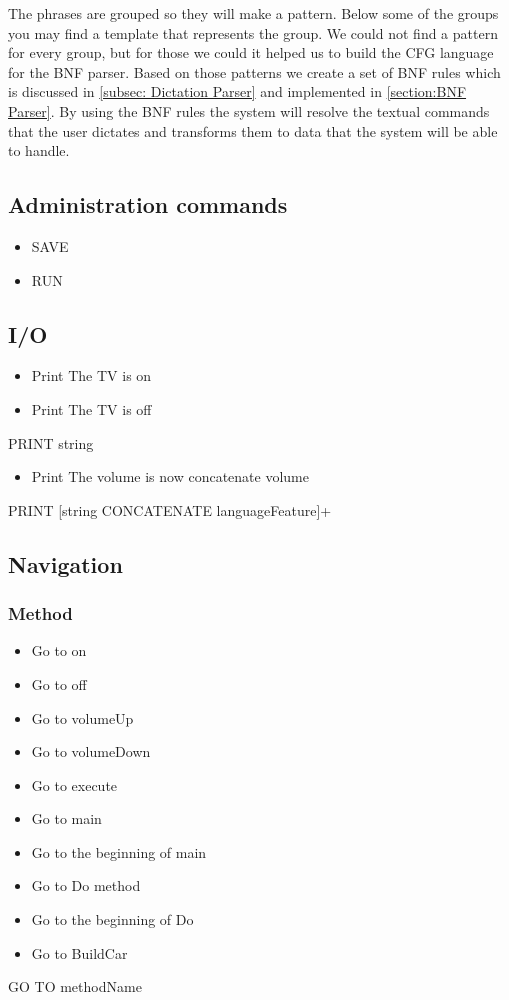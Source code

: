 The phrases are grouped so they will make a pattern. Below some of the groups you may find a template that represents the group. We could not find a pattern for every group, but for those we could it helped us to build the CFG language for the BNF parser. Based on those patterns we create a set of BNF rules which is discussed in \autoref{subsec: Dictation Parser} and implemented in \autoref{section:BNF Parser}. By using the BNF rules the system will resolve the textual commands that the user dictates and transforms them to data that the system will be able to handle.
\subsection{Administration commands}
\begin{itemize}
	\item SAVE
	\item RUN
\end{itemize}
\subsection{I/O}
\begin{itemize}
	\item Print The TV is on
	\item Print The TV is off
\end{itemize}
PRINT string
\begin{itemize}
	\item Print The volume is now concatenate volume
\end{itemize}
PRINT [string CONCATENATE languageFeature]+
\subsection{Navigation}
\subsubsection{Method}
\begin{itemize}
	\item Go to on
	\item Go to off
	\item Go to volumeUp
	\item Go to volumeDown
	\item Go to execute
	\item Go to main
	\item Go to the beginning of main
	\item Go to Do method
	\item Go to the beginning of Do
	\item Go to BuildCar
\end{itemize}
GO TO methodName
